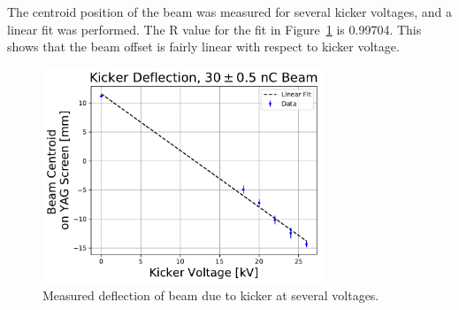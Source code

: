 The centroid position of the beam was measured for several kicker voltages, and a linear fit was performed.
The R value for the fit in Figure~\ref{fig:linear} is 0.99704. This shows that the beam offset 
is fairly linear with respect to kicker voltage. 
\begin{figure}
	\centering
	\includegraphics[width=0.75\textwidth]{./images/kicker_linearity}
	\caption{Measured deflection of beam due to kicker at several voltages.}
	\label{fig:linear}
\end{figure}

